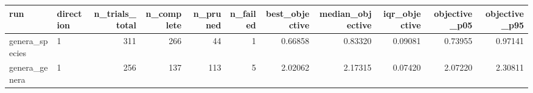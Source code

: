 \begin{tabular}{llrrrrrrrrr}
\toprule
run & direction & n_trials_total & n_complete & n_pruned & n_failed & best_objective & median_objective & iqr_objective & objective_p05 & objective_p95 \\
\midrule
genera_species & 1 & 311 & 266 & 44 & 1 & 0.66858 & 0.83320 & 0.09081 & 0.73955 & 0.97141 \\
genera_genera & 1 & 256 & 137 & 113 & 5 & 2.02062 & 2.17315 & 0.07420 & 2.07220 & 2.30811 \\
\bottomrule
\end{tabular}
